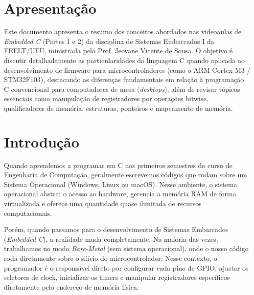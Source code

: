 \documentclass[12pt, a4paper]{article}
\begin{document}
\section*{Apresentação}
\hspace*{1.25cm}Este documento apresenta o resumo dos conceitos abordados nas videoaulas de \textit{Embedded C} (Partes 1 e 2) da disciplina de Sistemas Embarcados I da FEELT/UFU, ministrada pelo Prof. Jeovane Vicente de Sousa. O objetivo é discutir detalhadamente as particularidades da linguagem C quando aplicada ao desenvolvimento de firmware para microcontroladores (como o ARM Cortex-M3 / STM32F103), destacando as diferenças fundamentais em relação à programação C convencional para computadores de mesa (\textit{desktops}), além de revisar tópicos essenciais como manipulação de registradores por operações bitwise, qualificadores de memória, estruturas, ponteiros e mapeamento de memória.

\newpage
\tableofcontents
\newpage

\section{Introdução}
\hspace*{1.25cm}Quando aprendemos a programar em C nos primeiros semestres do curso de Engenharia de Computação, geralmente escrevemos códigos que rodam sobre um Sistema Operacional (Windows, Linux ou macOS). Nesse ambiente, o sistema operacional abstrai o acesso ao hardware, gerencia a memória RAM de forma virtualizada e oferece uma quantidade quase ilimitada de recursos computacionais.

Porém, quando passamos para o desenvolvimento de Sistemas Embarcados (\textit{Embedded C}), a realidade muda completamente. Na maioria das vezes, trabalhamos no modo \textit{Bare-Metal} (sem sistema operacional), onde o nosso código roda diretamente sobre o silício do microcontrolador. Nesse contexto, o programador é o responsável direto por configurar cada pino de GPIO, ajustar os seletores de clock, inicializar os timers e manipular registradores específicos diretamente pelo endereço de memória física.

\end{document}
